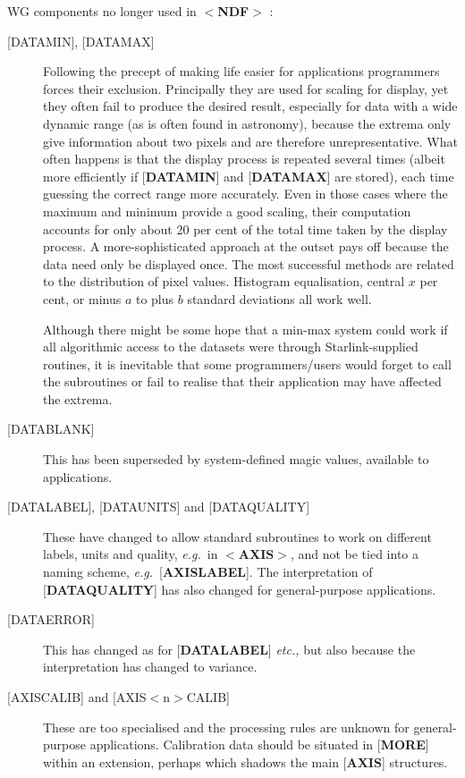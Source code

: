 \documentclass[twoside,11pt]{article}
\renewcommand{\_}{\texttt{\symbol{95}}}
\begin{document}
WG components no longer used in $<${\bf NDF}$>$ :
\begin{description}
\item [{[}DATA\_MIN{]}, {[}DATA\_MAX{]}]  Following the precept of making
life easier for
applications programmers forces their exclusion.  Principally they are
used for scaling for display, yet they often fail to produce the desired
result, especially for data with a wide dynamic range (as is often
found in astronomy), because the extrema only give information about
two pixels and are therefore unrepresentative.  What often happens is that
the display process is repeated several times (albeit more efficiently
if {[}{\bf DATA\_MIN}{]} and {[}{\bf DATA\_MAX}{]} are stored), each time
guessing the correct range more accurately.  Even in those cases where
the maximum and minimum provide a good scaling, their computation accounts
for only about 20 per cent of the total time taken by the display
process.
A more-sophisticated approach at the outset pays off because the data
need only be displayed once.  The most successful methods are related to
the distribution of pixel values.  Histogram equalisation, central $x$
per cent, or minus $a$ to plus $b$ standard deviations all work well.

Although there might be some hope that a min-max system could work if all
algorithmic access to the datasets were through Starlink-supplied
routines, it is inevitable that some programmers/users would forget
to call the subroutines or fail to realise that their application may
have affected the extrema.
\item [{[}DATA\_BLANK{]}]  This has been superseded by
system-defined magic values,
available to applications.
\item [{[}DATA\_LABEL{]}, {[}DATA\_UNITS{]} and {[}DATA\_QUALITY{]}]  These
have changed to allow
standard subroutines to work on different labels, units and quality,
{\it e.g.}\  in $<${\bf AXIS}$>$, and not be tied into a naming scheme,
{\it e.g.}\  {[}{\bf AXIS\_LABEL}{]}.
The interpretation of {[}{\bf DATA\_QUALITY}{]} has also changed for general-purpose
applications.
\item [{[}DATA\_ERROR{]}]  This has changed as for {[}{\bf DATA\_LABEL}{]}
{\it etc.,} but also because the interpretation has changed to variance.
\item [{[}AXIS\_CALIB{]} and {[}AXIS$<$n$>$\_CALIB{]}]  These are too specialised and the
processing rules are unknown for general-purpose applications.
Calibration data should be situated in {[}{\bf MORE}{]} within an extension, perhaps
which shadows the main {[}{\bf AXIS}{]} structures.
\end{description}
\end{document}

